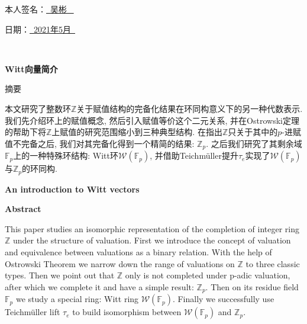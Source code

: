 \documentclass[UTF8, twoside]{ctexart}
\theoremstyle{nonumberplain}
\theoremstyle{nonumberplain}
\theoremstyle{plain}
\begin{document}
	\vskip 1.5cm
	
	{
	\kaishu {}
	\qquad \qquad \qquad \qquad \qquad \qquad \qquad 
	本人签名：\underline{\qquad \quad \ 吴\quad 彬 \qquad \quad \ }
	
	\vskip 0.3cm
	
	\qquad \qquad \qquad \qquad \qquad \qquad \qquad 
	日\qquad 期：\underline{\qquad \ 2021年5月\  \qquad }
	}

	\newpage
	\thispagestyle{empty}
	\ 
	\newpage
	
	
	
	\begin{center}
		\heiti {}
		\textbf{Witt向量简介}
	\end{center}
	
	\begin{center}
		\heiti {}
		\vskip 0.4cm
		摘要
	\end{center}
	
	本文研究了整数环$\mathbb{Z}$关于赋值结构的完备化结果在环同构意义下的另一种代数表示. 我们先介绍环上的赋值概念, 然后引入赋值等价这个二元关系, 并在Ostrowski定理的帮助下将$\mathbb{Z}$上赋值的研究范围缩小到三种典型结构. 在指出$\mathbb{Z}$只关于其中的$p$-进赋值不完备之后, 我们对其完备化得到一个精简的结果: ${{\mathbb{Z}}_{p}}$. 之后我们研究了其剩余域${{\mathbb{F}}_{p}}$上的一种特殊环结构: Witt环$\mathcal{W}\left( {{\mathbb{F}}_{p}} \right)$, 并借助Teichmüller提升${{\tau }_{e}}$实现了$\mathcal{W}\left( {{\mathbb{F}}_{p}} \right)$与${{\mathbb{Z}}_{p}}$的环同构.
	\vskip 0.2cm
	\vskip 1.5cm
	
	
	\begin{center}
		\textbf{An introduction to Witt vectors}
	\end{center}

	\begin{center}
		\vskip 0.4cm
		\textbf{Abstract}
	\end{center}
	
	This paper studies an isomorphic representation of the completion of integer ring $\mathbb{Z}$ under the structure of valuation. First we introduce the concept of valuation and equivalence between valuations as a binary relation. With the help of Ostrowski Theorem we narrow down the range of valuations on $\mathbb{Z}$ to three classic types. Then we point out that $\mathbb{Z}$ only is not completed under p-adic valuation, after which we complete it and have a simple result: ${{\mathbb{Z}}_{p}}$. Then on its residue field ${{\mathbb{F}}_{p}}$ we study a special ring: Witt ring $\mathcal{W}\left( {{\mathbb{F}}_{p}} \right)$. Finally we successfully use Teichmüller lift ${{\tau }_{e}}$ to build isomorphism between $\mathcal{W}\left( {{\mathbb{F}}_{p}} \right)$ and ${{\mathbb{Z}}_{p}}$.
	\vskip 0.2cm
	
\end{document}
